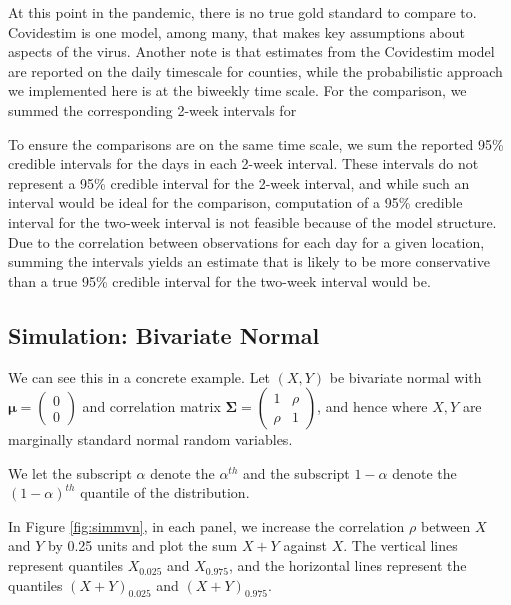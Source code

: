 \documentclass[12pt,twoside]{smiththesis}
\begin{document}
At this point in the pandemic, there is no true gold standard to compare to. Covidestim is one model, among many, that makes key assumptions about aspects of the virus. Another note is that estimates from the Covidestim model are reported on the daily timescale for counties, while the probabilistic approach we implemented here is at the biweekly time scale. For the comparison, we summed the corresponding 2-week intervals for

To ensure the comparisons are on the same time scale, we sum the reported 95\% credible intervals for the days in each 2-week interval. These intervals do not represent a 95\% credible interval for the 2-week interval, and while such an interval would be ideal for the comparison, computation of a 95\% credible interval for the two-week interval is not feasible because of the model structure. Due to the correlation between observations for each day for a given location, summing the intervals yields an estimate that is likely to be more conservative than a true 95\% credible interval for the two-week interval would be.

\newpage

\hypertarget{simulation-bivariate-normal}{%
\subsection{Simulation: Bivariate Normal}\label{simulation-bivariate-normal}}

We can see this in a concrete example. Let \((X,Y)\) be bivariate normal with \(\boldsymbol \mu = \begin{pmatrix} 0\\0\end{pmatrix}\) and correlation matrix \(\boldsymbol \Sigma = \begin{pmatrix} 1 & \rho \\ \rho & 1 \end{pmatrix}\), and hence where \(X, Y\) are marginally standard normal random variables.

We let the subscript \(\alpha\) denote the \(\alpha^{th}\) and the subscript \(1-\alpha\) denote the \((1-\alpha)^{th}\) quantile of the distribution.

In Figure \ref{fig:simmvn}, in each panel, we increase the correlation \(\rho\) between \(X\) and \(Y\) by 0.25 units and plot the sum \(X +Y\) against \(X\). The vertical lines represent quantiles \(X_{0.025}\) and \(X_{0.975}\), and the horizontal lines represent the quantiles \((X+Y)_{0.025}\) and \((X+Y)_{0.975}\).
\end{document}
